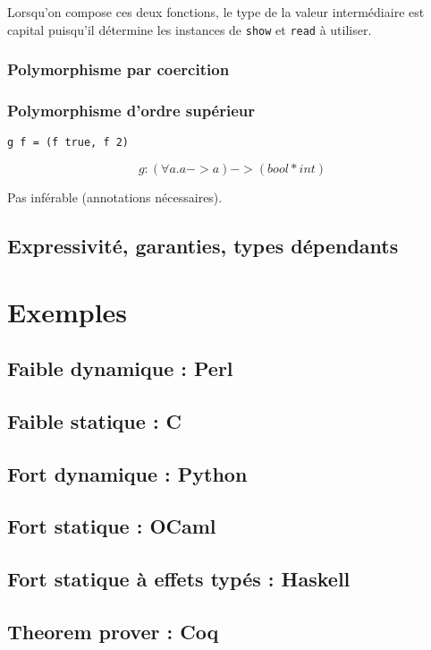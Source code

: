 Lorsqu'on compose ces deux fonctions, le type de la valeur intermédiaire est
capital puisqu'il détermine les instances de \texttt{show} et \texttt{read} à
utiliser.

\subsubsection{Polymorphisme par coercition}

\subsubsection{Polymorphisme d'ordre supérieur}

\begin{verbatim}
g f = (f true, f 2)
\end{verbatim}

\[
g : (\forall a . a -> a) -> (bool * int)
\]

Pas inférable (annotations nécessaires).

\subsection{Expressivité, garanties, types dépendants}

\section{Exemples}

\subsection{Faible dynamique : Perl}
\subsection{Faible statique : C}
\subsection{Fort dynamique : Python}
\subsection{Fort statique : OCaml}
\subsection{Fort statique à effets typés : Haskell}
\subsection{Theorem prover : Coq}

